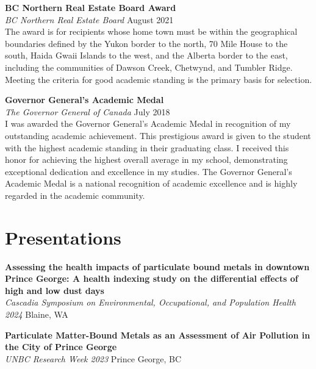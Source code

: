 \documentclass[11pt]{article}
\begin{document}
\vspace{8pt}

\noindent\textbf{BC Northern Real Estate Board Award} \\
\textit{BC Northern Real Estate Board} \hfill August 2021 \\
The award is for recipients whose home town must be within the geographical boundaries defined by the Yukon border to the north, 70 Mile House to the south, Haida Gwaii Islands to the west, and the Alberta border to the east, including the communities of Dawson Creek, Chetwynd, and Tumbler Ridge. Meeting the criteria for good academic standing is the primary basis for selection.

\vspace{8pt}

\noindent\textbf{Governor General's Academic Medal} \\
\textit{The Governor General of Canada} \hfill July 2018 \\
I was awarded the Governor General's Academic Medal in recognition of my outstanding academic achievement. This prestigious award is given to the student with the highest academic standing in their graduating class. I received this honor for achieving the highest overall average in my school, demonstrating exceptional dedication and excellence in my studies. The Governor General's Academic Medal is a national recognition of academic excellence and is highly regarded in the academic community.

\section{Presentations}

\vspace{4pt}

\noindent\textbf{Assessing the health impacts of particulate bound metals in downtown Prince George: A health indexing study on the differential effects of high and low dust days} \\
\textit{Cascadia Symposium on Environmental, Occupational, and Population Health 2024} \hfill Blaine, WA

\vspace{8pt}

\noindent\textbf{Particulate Matter-Bound Metals as an Assessment of Air Pollution in the City of Prince George} \\
\textit{UNBC Research Week 2023} \hfill Prince George, BC
\end{document}
